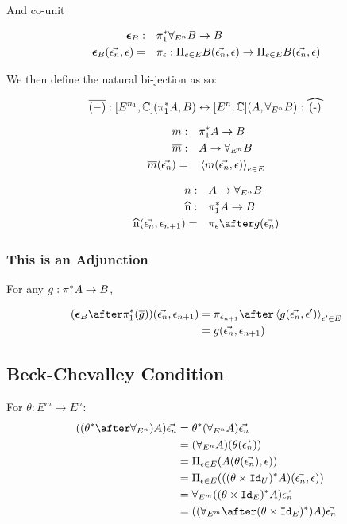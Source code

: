 \documentclass{report}
\begin{document}
And co-unit


\begin{align}
    \boldsymbol{\epsilon}_{B} : &\quad \pi_1^*\forall_{E^n} B \rightarrow B\\
    \boldsymbol{\epsilon}_{B}(\vec{\epsilon_n}, \epsilon) =&\quad \pi_\epsilon : \Pi_{e\in E}B(\vec{\epsilon_n}, \epsilon)\rightarrow \Pi_{e\in E}B(\vec{\epsilon_n}, \epsilon)
\end{align}


We then define the natural bi-jection as so:

\begin{equation}
    \bar{(-)}: [E^{n_1}, \C](\pstar A, B) \leftrightarrow [E^n,\C] (A, \allEn B): \widehat{(-)}
\end{equation}

\begin{align}
    m:&\quad \pi_1^* A \rightarrow B\\
    \overline{m}:&\quad A\rightarrow \forall_{E^n} B\\
    \overline{m}(\vec{\epsilon_n}) =&\quad \left\langle m(\vec{\epsilon_n}, \epsilon)\right\rangle_{e\in E}
\end{align}


\begin{align}
    n:&\quad A \rightarrow \allEn B\\
    \widehat{n}:&\quad \pstar A\rightarrow B\\
    \widehat{n}(\env, \e_{n+1}) =&\quad\pi_\e\after g(\env)
\end{align}

\subsubsection{This is an Adjunction}
For any $g: \pi_1^* A \rightarrow B$,

\begin{align}
    (\counit{B}\after\pstar(\bar{g}))(\env, \e_{n+1}) & = \pi_{\e_{n+1}}\after\finpr{g(\env, \e')}{\e'\in E}\\
    &= g(\env, \e_{n+1})
\end{align}

\subsection{Beck-Chevalley Condition}

For $\theta: E^m \rightarrow E^n$:
\begin{align}
    ((\theta\star\after\allEn)A)\env &= \theta\star(\allEn A)\env\\
    &= (\allEn A)(\theta(\env))\\
    &= \Pi_{\e\in E}(A(\theta(\env), \e))\\
    &= \Pi_{\e\in E}(((\theta\times \Id{U})\star A)(\env, \e))\\
    &= \allEm((\theta\times\Id{E})\star A)\env\\
    &= ((\allEm\after(\theta\times\Id{E})\star)A)\env
\end{align}
\end{document}

